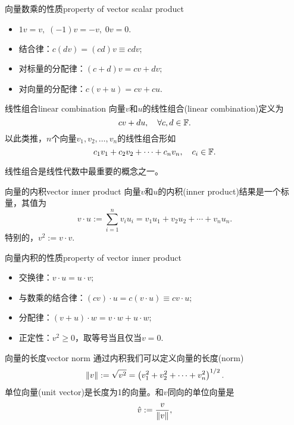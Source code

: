 \begin{theorem}{向量数乘的性质}{property of vector scalar product}
    \begin{itemize}
    	\item $1v=v,\;(-1)v=-v,\;0v=0.$
    	\item 结合律：$c(dv)=(cd)v\equiv cdv;$
    	\item 对标量的分配律：$(c+d)v=cv+dv;$
    	\item 对向量的分配律：$c(v+u)=cv+cu.$
    \end{itemize}
\end{theorem}
\begin{definition}{线性组合}{linear combination}
	向量$v$和$u$的线性组合(linear combination)定义为
	\[
		cv+du,\quad\forall c,d\in\mathbb F.
	\]
	以此类推，$n$个向量$v_1,v_2,\ldots,v_n$的线性组合形如
	\[
		c_1v_1+c_2v_2+\cdots+c_nv_n,\quad c_i\in\mathbb F.
	\]
\end{definition}
线性组合是线性代数中最重要的概念之一。
\begin{definition}{向量的内积}{vector inner product}
	向量$v$和$u$的内积(inner product)结果是一个标量，其值为
	\begin{equation}
		v\cdot u:=\sum_{i=1}^nv_iu_i=v_1u_1+v_2u_2+\cdots+v_nu_n.
	\end{equation}
	特别的，$v^2:=v\cdot v.$
\end{definition}
\begin{theorem}{向量内积的性质}{property of vector inner product}
    \begin{itemize}
    	\item 交换律：$v\cdot u=u\cdot v;$
    	\item 与数乘的结合律：$(cv)\cdot u=c(v\cdot u)\equiv cv\cdot u;$
    	\item 分配律：$(v+u)\cdot w=v\cdot w+u\cdot w;$
    	\item 正定性：$v^2\geqslant 0$，取等号当且仅当$v=0.$
    \end{itemize}
\end{theorem}
\begin{definition}{向量的长度}{vector norm}
	通过内积我们可以定义向量的长度(norm)
	\begin{equation}
		\left\lVert v\right\rVert:=\sqrt{v^2}=\left(v_1^2+v_2^2+\cdots+v_n^2\right)^{1/2}.
	\end{equation}
	单位向量(unit vector)是长度为1的向量。和$v$同向的单位向量是
    \begin{equation}
        \hat v:=\frac{v}{\left\lVert v\right\rVert},
    \end{equation}
\end{definition}

